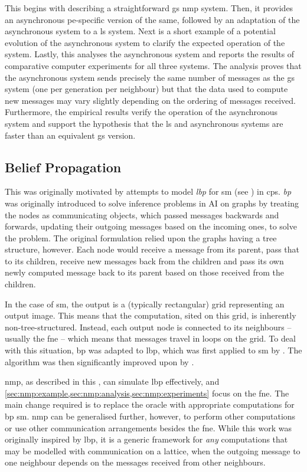 This  begins with describing a straightforward \gls{gs} \gls{nmp} system.  Then, it provides an asynchronous \gls{pe}-specific version of the same, followed by an adaptation of the asynchronous system to a \gls{ls} system. Next is a short example of a potential evolution of the asynchronous system to clarify the expected operation of the system.  Lastly, this  analyses the asynchronous system and reports the results of comparative computer experiments for all three systems.  The analysis proves that the asynchronous system sends precisely the same number of messages as the \gls{gs} system (one per generation per neighbour) but that the data used to compute new messages may vary slightly depending on the ordering of messages received.  Furthermore, the empirical results verify the operation of the asynchronous system and support the hypothesis that the \gls{ls} and asynchronous systems are faster than an equivalent \gls{gs} version.

\subsection{Belief Propagation}

This  was originally motivated by attempts to model \emph{\gls{lbp}} for \gls{sm} (see \eg{} \cite{Blake2011,Felzenszwalb2011,JianSun2003}) in \gls{cps}.  \emph{\Gls{bp}} was originally introduced to solve inference problems in AI on graphs \cite{Pearl1982} by treating the nodes as communicating objects, which passed messages backwards and forwards, updating their outgoing messages based on the incoming ones, to solve the problem.  The original formulation relied upon the graphs having a tree structure, however.  Each node would receive a message from its parent, pass that to its children, receive new messages back from the children and pass its own newly computed message back to its parent based on those received from the children.

In the case of \gls{sm}, the output is a (typically rectangular) grid representing an output image.  This means that the computation, sited on this grid, is inherently non-tree-structured.  Instead, each output node is connected to its neighbours -- usually the \gls{fne} -- which means that messages travel in loops on the grid.  To deal with this situation, \gls{bp} was adapted to \gls{lbp}, which was first applied to \gls{sm} by \citeauthor{JianSun2003} \cite{JianSun2003}.  The algorithm was then significantly improved upon by \citeauthor{Felzenszwalb2006} \cite{Felzenszwalb2006}.

\Gls{nmp}, as described in this , can simulate \gls{lbp} effectively, and \cref{sec:nmp:example,sec:nmp:analysis,sec:nmp:experiments} focus on the \gls{fne}.  The main change required is to replace the oracle with appropriate computations for \gls{bp} \gls{sm}.  \Gls{nmp} can be generalised further, however, to perform other computations or use other communication arrangements besides the \gls{fne}.  While this work was originally inspired by \gls{lbp}, it is a generic framework for \emph{any} computations that may be modelled with communication on a lattice, when the outgoing message to one neighbour depends on the messages received from other neighbours.